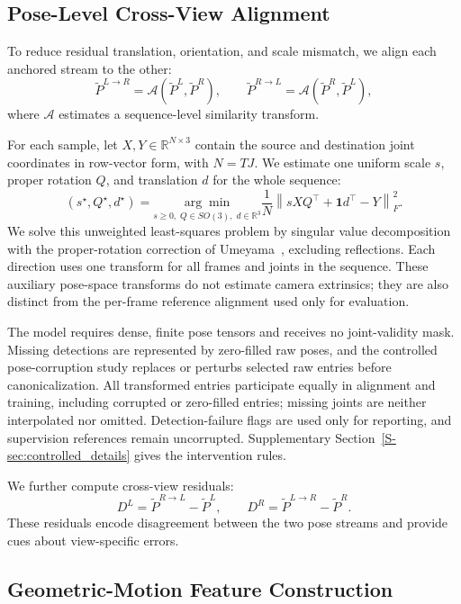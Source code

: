 \documentclass[preprint,12pt]{elsarticle}
\begin{document}
\subsection{Pose-Level Cross-View Alignment}
\label{subsec:pose_alignment}

To reduce residual translation, orientation, and scale mismatch, we align each anchored stream to the other:
\[
\tilde{P}^{L \rightarrow R} = \mathcal{A}(\tilde{P}^{L}, \tilde{P}^{R}),
\qquad
\tilde{P}^{R \rightarrow L} = \mathcal{A}(\tilde{P}^{R}, \tilde{P}^{L}),
\]
where \(\mathcal{A}\) estimates a sequence-level similarity transform.

For each sample, let \(X,Y\in\mathbb{R}^{N\times3}\) contain the source and destination joint coordinates in row-vector form, with \(N=TJ\). We estimate one uniform scale \(s\), proper rotation \(Q\), and translation \(d\) for the whole sequence:
\[
(s^\star,Q^\star,d^\star)=
\underset{s\geq0,\;Q\in SO(3),\;d\in\mathbb{R}^{3}}{\arg\min}
\frac{1}{N}\left\|sXQ^\top+\mathbf{1}d^\top-Y\right\|_F^2.
\]
We solve this unweighted least-squares problem by singular value decomposition with the proper-rotation correction of Umeyama~\cite{umeyama1991least}, excluding reflections. Each direction uses one transform for all frames and joints in the sequence. These auxiliary pose-space transforms do not estimate camera extrinsics; they are also distinct from the per-frame reference alignment used only for evaluation.

The model requires dense, finite pose tensors and receives no joint-validity mask. Missing detections are represented by zero-filled raw poses, and the controlled pose-corruption study replaces or perturbs selected raw entries before canonicalization. All transformed entries participate equally in alignment and training, including corrupted or zero-filled entries; missing joints are neither interpolated nor omitted. Detection-failure flags are used only for reporting, and supervision references remain uncorrupted. Supplementary Section~\ref{S-sec:controlled_details} gives the intervention rules.

We further compute cross-view residuals:
\[
D^{L} = \tilde{P}^{R \rightarrow L} - \tilde{P}^{L},
\qquad
D^{R} = \tilde{P}^{L \rightarrow R} - \tilde{P}^{R}.
\]
These residuals encode disagreement between the two pose streams and provide cues about view-specific errors.

\subsection{Geometric-Motion Feature Construction}
\label{subsec:feature_construction}
\end{document}
